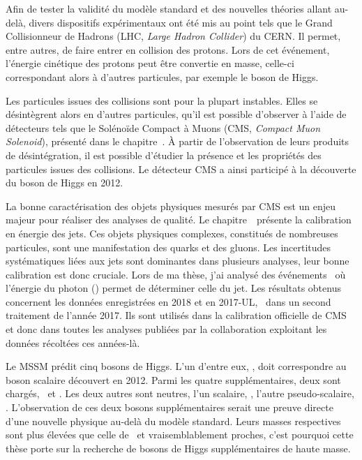 \par
Afin de tester la validité du modèle standard et des nouvelles théories allant au-delà,
divers dispositifs expérimentaux ont été mis au point
tels que
le Grand Collisionneur de Hadrons (LHC, \emph{Large Hadron Collider})
du CERN.
Il permet, entre autres, de faire entrer en collision des protons.
Lors de cet événement,
l'énergie cinétique des protons
peut être convertie en masse,
celle-ci correspondant alors à d'autres particules,
par exemple le boson de Higgs.
\par
Les particules issues des collisions sont pour la plupart instables.
Elles se désintègrent alors en d'autres particules,
qu'il est possible d'observer à l'aide de détecteurs tels que
le Solénoïde Compact à Muons (CMS, \emph{Compact Muon Solenoid}),
présenté dans le chapitre~.
À partir de l'observation de leurs produits de désintégration,
il est possible d'étudier la présence et les propriétés des particules issues des collisions.
Le détecteur CMS a ainsi participé à la découverte du boson de Higgs en 2012.
\par
La bonne caractérisation des objets physiques mesurés par CMS est un enjeu majeur
pour réaliser des analyses de qualité.
Le chapitre~\ présente la calibration en énergie des jets.
Ces objets physiques complexes, constitués de nombreuses particules,
sont une manifestation des quarks et des gluons.
Les incertitudes systématiques liées aux jets sont dominantes dans plusieurs analyses,
leur bonne calibration est donc cruciale.
Lors de ma thèse, j'ai analysé des événements \Gjets\
où l'énergie du photon (\photon) permet de déterminer celle du jet.
Les résultats obtenus
concernent les données enregistrées en 2018 et en 2017-UL,
\ie\ dans un second traitement de l'année 2017.
Ils sont utilisés dans la calibration officielle de CMS
et donc dans toutes les analyses publiées par la collaboration
exploitant les données récoltées ces années-là.
\par
Le MSSM prédit cinq bosons de Higgs.
L'un d'entre eux, \higgs, doit correspondre au boson scalaire découvert en 2012.
Parmi les quatre supplémentaires, deux sont chargés, \Higgsplus\ et \Higgsminus.
Les deux autres sont neutres,
l'un scalaire, \Higgs,
l'autre pseudo-scalaire, \HiggsA.
L'observation de ces deux 
bosons supplémentaires
serait une preuve directe d'une nouvelle physique au-delà du modèle standard.
Leurs masses respectives sont plus élevées que celle de \higgs\
et vraisemblablement proches,
c'est pourquoi cette thèse porte sur la
recherche de bosons de Higgs supplémentaires de haute masse.
